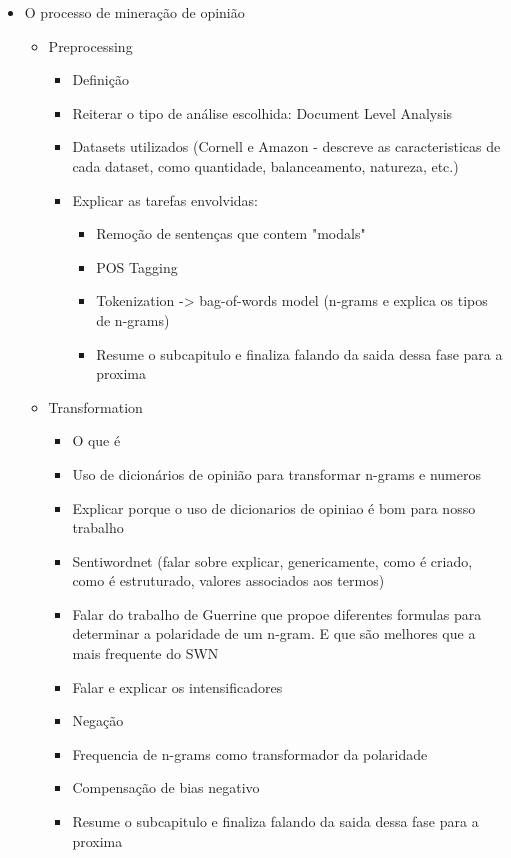 \documentclass[msc, a4paper, classic, pt]{ufbathesis}
\begin{document}
\begin{itemize}
\item O processo de mineração de opinião
\begin{itemize}

\item Preprocessing
\begin{itemize}
\item Definição
\item Reiterar o tipo de análise escolhida: Document Level Analysis
\item Datasets utilizados (Cornell e Amazon - descreve as caracteristicas de cada dataset, como quantidade, balanceamento, natureza, etc.)

\item Explicar as tarefas envolvidas:
\begin{itemize}
\item Remoção de sentenças que contem "modals"
\item POS Tagging
\item Tokenization -> bag-of-words model (n-grams e explica os tipos de n-grams)
\item Resume o subcapitulo e finaliza falando da saida dessa fase para a proxima
\end{itemize}
\end{itemize}

\item Transformation
\begin{itemize}
\item O que é
\item Uso de dicionários de opinião para transformar n-grams e numeros
\item Explicar porque o uso de dicionarios de opiniao é bom para nosso trabalho
\item Sentiwordnet (falar sobre explicar, genericamente, como é criado, como é estruturado, valores associados aos termos)
\item Falar do trabalho de Guerrine que propoe diferentes formulas para determinar a polaridade de um n-gram. E que são melhores que a mais frequente do SWN
\item Falar e explicar os intensificadores
\item Negação
\item Frequencia de n-grams como transformador da polaridade
\item Compensação de bias negativo
\item Resume o subcapitulo e finaliza falando da saida dessa fase para a proxima 
\end{itemize}


\end{itemize}
\end{itemize}
\end{document}
